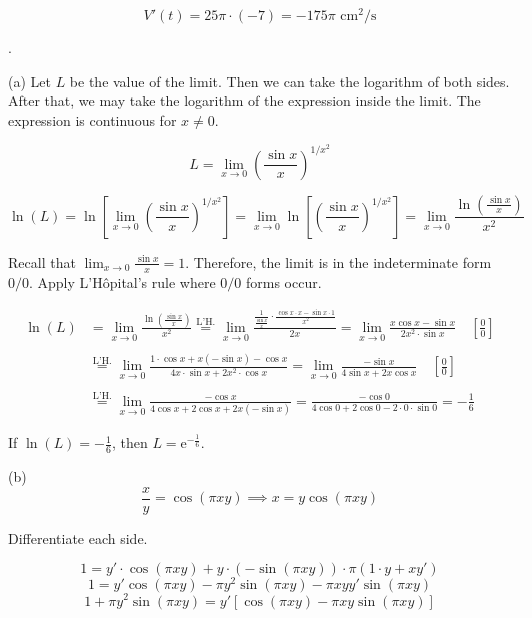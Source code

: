 \documentclass{article}
\begin{document}
\[V'(t)=25\pi\cdot(-7)=\boxed{-175\pi\text{ cm}^2\text{/s}}\]

\hfill

.

\hfill

\noindent (a) Let $L$ be the value of the limit. Then we can take the logarithm of both sides. After that, we may take the logarithm of the expression inside the limit. The expression is continuous for $x\neq0$.

\[L=\lim_{x\to0}\left(\frac{\sin x}x\right)^{1/x^2}\]

\[\ln(L) = \ln\left[\lim_{x\to0}\left(\frac{\sin x}x\right)^{1/x^2}\right]=\lim_{x\to0}\ln\left[\left(\frac{\sin x}x\right)^{1/x^2}\right]=\lim_{x\to0}\frac{\ln\left(\frac{\sin x}x\right)}{x^2}\]

\hfill

\noindent Recall that $\displaystyle \lim_{x\to0}\frac{\sin x}x=1$. Therefore, the limit is in the indeterminate form $0/0$. Apply L'Hôpital's rule where $0/0$ forms occur.

\begin{align*}
\ln(L)&=\lim_{x\to0}\frac{\ln\left(\frac{\sin x}x\right)}{x^2}\overset{\text{L'H.}}{=}\lim_{x\to0}\frac{\displaystyle\frac1{\frac{\sin x}x}\cdot\frac{\cos x\cdot x-\sin x\cdot1}{x^2}}{2x}=\lim_{x\to0}\frac{x\cos x-\sin x}{2x^2\cdot\sin x}\quad\left[\frac00\right]\\\\&\overset{\text{L'H.}}{=}\lim_{x\to0}\frac{1\cdot\cos x+x(-\sin x)-\cos x}{4x\cdot\sin x+2x^2\cdot\cos x}=\lim_{x\to0}\frac{-\sin x}{4\sin x+2x\cos x}\quad\left[\frac00\right]\\\\&\overset{\text{L'H.}}{=}\lim_{x\to0}\frac{-\cos x}{4\cos x+2\cos x+2x(-\sin x)}=\frac{-\cos0}{4\cos0+2\cos0-2\cdot0\cdot\sin0}=-\frac16
\end{align*}

\noindent If $\displaystyle \ln(L)=-\frac16$, then $\boxed{L=\mathrm{e}^{\textstyle-\frac16}}$.

\hfill

\noindent (b)
\[\frac xy=\cos(\pi xy)\implies x=y\cos(\pi xy)\]

\hfill

\noindent Differentiate each side.

\[1=y'\cdot\cos(\pi xy)+y\cdot(-\sin(\pi xy))\cdot\pi(1\cdot y+xy')\]
\[1=y'\cos(\pi xy)-\pi y^2\sin(\pi xy)-\pi xyy'\sin(\pi xy)\]
\[1+\pi y^2\sin(\pi xy)=y'\left[\cos(\pi xy)-\pi xy\sin(\pi xy)\right]\]
\end{document}
